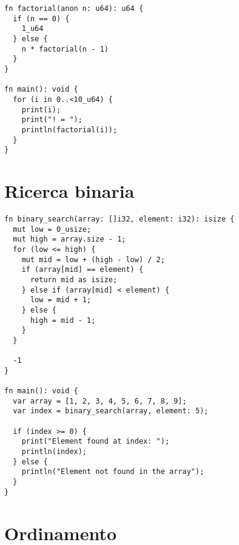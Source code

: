 \begin{mdframed}[style=examplestyle]
	\begin{verbatim}
fn factorial(anon n: u64): u64 {
  if (n == 0) {
    1_u64
  } else {
    n * factorial(n - 1)
  }
}

fn main(): void {
  for (i in 0..<10_u64) {
    print(i);
    print("! = ");
    println(factorial(i));
  }
}
	\end{verbatim}
\end{mdframed}

\section{Ricerca binaria}
\label{sec:binary-search-example}

\hfill

\begin{mdframed}[style=examplestyle]
	\begin{verbatim}
fn binary_search(array: []i32, element: i32): isize {
  mut low = 0_usize;
  mut high = array.size - 1;
  for (low <= high) {
    mut mid = low + (high - low) / 2;
    if (array[mid] == element) {
      return mid as isize;
    } else if (array[mid] < element) {
      low = mid + 1;
    } else {
      high = mid - 1;
    }
  }

  -1
}

fn main(): void {
  var array = [1, 2, 3, 4, 5, 6, 7, 8, 9];
  var index = binary_search(array, element: 5);

  if (index >= 0) {
    print("Element found at index: ");
    println(index);
  } else {
    println("Element not found in the array");
  }
}
	\end{verbatim}
\end{mdframed}

\section{Ordinamento}
\label{sec:sorting-example}

\hfill

